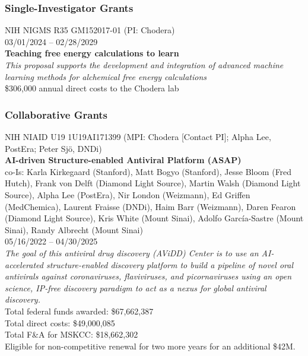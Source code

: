\documentclass[10pt]{article}
\begin{document}
\subsubsection*{Single-Investigator Grants}

NIH NIGMS R35 GM152017-01 (PI: Chodera)\\
03/01/2024 -- 02/28/2029\\
{\bf Teaching free energy calculations to learn}\\
\emph{This proposal supports the development and integration of advanced machine learning methods for alchemical free energy calculations}\\
\$306,000 annual direct costs to the Chodera lab\\




\subsubsection*{Collaborative Grants}

NIH NIAID U19 1U19AI171399 (MPI: Chodera [Contact PI]; Alpha Lee, PostEra; Peter Sj\"{o}, DNDi) \\
{\bf AI-driven Structure-enabled Antiviral Platform (ASAP)}\\
co-Is: Karla Kirkegaard (Stanford), Matt Bogyo (Stanford), Jesse Bloom (Fred Hutch), Frank von Delft (Diamond Light Source), Martin Walsh (Diamond Light Source), Alpha Lee (PostEra), Nir London (Weizmann), Ed Griffen (MedChemica), Laurent Fraisse (DNDi), Haim Barr (Weizmann), Daren Fearon (Diamond Light Source), Kris White (Mount Sinai), Adolfo Garc\'{i}a-Sastre (Mount Sinai), Randy Albrecht (Mount Sinai) \\
05/16/2022 -- 04/30/2025\\
\emph{The goal of this antiviral drug discovery (AViDD) Center is to use an AI-accelerated structure-enabled discovery platform to build a pipeline of novel oral antivirals against coronaviruses, flaviviruses, and picornaviruses using an open science, IP-free discovery paradigm to act as a nexus for global antiviral discovery.}\\
Total federal funds awarded: \$67,662,387\\
Total direct costs: \$49,000,085\\
Total F\&A for MSKCC: \$18,662,302\\
Eligible for non-competitive renewal for two more years for an additional \$42M.
\end{document}
